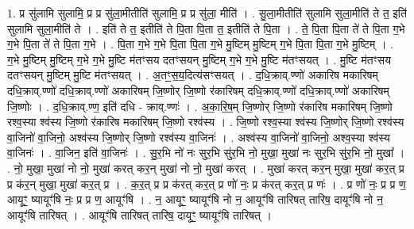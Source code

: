 \documentclass[17pt]{extarticle}
\begin{document}
1. प्र सु॑लामि सुलामि॒ प्र प्र सु॑ला॒मीतीति॑ सुलामि॒ प्र प्र सु॑ला॒ मीति॑ । . सु॒ला॒मीतीति॑ सुलामि सुला॒मीति॑ ते त॒ इति॑ सुलामि सुला॒मीति॑ ते । . इति॑ ते त॒ इतीति॑ ते पि॒ता पि॒ता त॒ इतीति॑ ते पि॒ता । . ते॒ पि॒ता पि॒ता ते॑ ते पि॒ता ग॒भे ग॒भे पि॒ता ते॑ ते पि॒ता ग॒भे । . पि॒ता ग॒भे ग॒भे पि॒ता पि॒ता ग॒भे मु॒ष्टिम् मु॒ष्टिम् ग॒भे पि॒ता पि॒ता ग॒भे मु॒ष्टिम् । . ग॒भे मु॒ष्टिम् मु॒ष्टिम् ग॒भे ग॒भे मु॒ष्टि म॑तꣳसय दतꣳसयन् मु॒ष्टिम् ग॒भे ग॒भे मु॒ष्टि म॑तꣳसयत् । . मु॒ष्टि म॑तꣳसय दतꣳसयन् मु॒ष्टिम् मु॒ष्टि म॑तꣳसयत् । . अ॒तꣳ॒॒स॒य॒दित्य॑सꣳसयत् । . द॒धि॒क्राव्.ण्णो॑ अकारिष मकारिषम् दधि॒क्राव्.ण्णो॑ दधि॒क्राव्.ण्णो॑ अकारिषम् जि॒ष्णोर् जि॒ष्णो र॑कारिषम् दधि॒क्राव्.ण्णो॑ दधि॒क्राव्.ण्णो॑ अकारिषम् जि॒ष्णोः । . द॒धि॒क्राव्.ण्ण॒ इति॑ दधि - क्राव्.ण्णः॑ । . अ॒का॒रि॒ष॒म् जि॒ष्णोर् जि॒ष्णो र॑कारिष मकारिषम् जि॒ष्णो रश्व॒स्या श्व॑स्य जि॒ष्णो र॑कारिष मकारिषम् जि॒ष्णो रश्व॑स्य । . जि॒ष्णो रश्व॒स्या श्व॑स्य जि॒ष्णोर् जि॒ष्णो रश्व॑स्य वा॒जिनो॑ वा॒जिनो॒ अश्व॑स्य जि॒ष्णोर् जि॒ष्णो रश्व॑स्य वा॒जिनः॑ । . अश्व॑स्य वा॒जिनो॑ वा॒जिनो॒ अश्व॒स्या श्व॑स्य वा॒जिनः॑ । . वा॒जिन॒ इति॑ वा॒जिनः॑ । . सु॒र॒भि नो॑ नः सुर॒भि सु॑र॒भि नो॒ मुखा॒ मुखा॑ नः सुर॒भि सु॑र॒भि नो॒ मुखा᳚ । . नो॒ मुखा॒ मुखा॑ नो नो॒ मुखा॑ करत् कर॒न् मुखा॑ नो नो॒ मुखा॑ करत् । . मुखा॑ करत् कर॒न् मुखा॒ मुखा॑ कर॒त् प्र प्र क॑र॒न् मुखा॒ मुखा॑ कर॒त् प्र । . क॒र॒त् प्र प्र क॑रत् कर॒त् प्र णो॑ नः॒ प्र क॑रत् कर॒त् प्र णः॑ । . प्र णो॑ नः॒ प्र प्र ण॒ आयूꣳ॒॒ ष्यायूꣳ॑षि नः॒ प्र प्र ण॒ आयूꣳ॑षि । . न॒ आयूꣳ॒॒ ष्यायूꣳ॑षि नो न॒ आयूꣳ॑षि तारिषत् तारिष॒ दायूꣳ॑षि नो न॒ आयूꣳ॑षि तारिषत् । . आयूꣳ॑षि तारिषत् तारिष॒ दायूꣳ॒॒ ष्यायूꣳ॑षि तारिषत् । \newline
\end{document}
